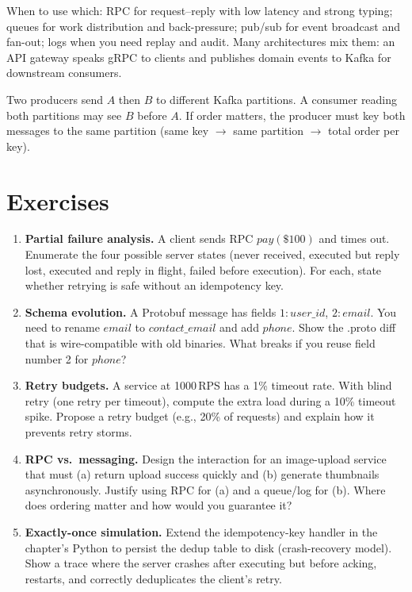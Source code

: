 When to use which: RPC for request--reply with low latency and strong typing; queues for work distribution and back-pressure; pub/sub for event broadcast and fan-out; logs when you need replay and audit. Many architectures mix them: an API gateway speaks gRPC to clients and publishes domain events to Kafka for downstream consumers.

\begin{example}
Two producers send $A$ then $B$ to different Kafka partitions. A consumer reading both partitions may see $B$ before $A$. If order matters, the producer must key both messages to the same partition (same key $\to$ same partition $\to$ total order per key).
\end{example}

\section{Exercises}
\label{sec:ch03-exercises}
\begin{enumerate}[label=E3.\arabic*, leftmargin=*, itemsep=0.6em]
    \item \textbf{Partial failure analysis.} A client sends RPC $pay(\$100)$ and times out. Enumerate the four possible server states (never received, executed but reply lost, executed and reply in flight, failed before execution). For each, state whether retrying is safe without an idempotency key.
    \item \textbf{Schema evolution.} A Protobuf message has fields $1{:}user\_id$, $2{:}email$. You need to rename $email$ to $contact\_email$ and add $phone$. Show the .proto diff that is wire-compatible with old binaries. What breaks if you reuse field number 2 for $phone$?
    \item \textbf{Retry budgets.} A service at 1000\,RPS has a 1\% timeout rate. With blind retry (one retry per timeout), compute the extra load during a 10\% timeout spike. Propose a retry budget (e.g., 20\% of requests) and explain how it prevents retry storms.
    \item \textbf{RPC vs.\ messaging.} Design the interaction for an image-upload service that must (a) return upload success quickly and (b) generate thumbnails asynchronously. Justify using RPC for (a) and a queue/log for (b). Where does ordering matter and how would you guarantee it?
    \item \textbf{Exactly-once simulation.} Extend the idempotency-key handler in the chapter's Python to persist the dedup table to disk (crash-recovery model). Show a trace where the server crashes after executing but before acking, restarts, and correctly deduplicates the client's retry.
\end{enumerate}

